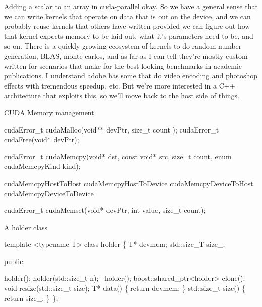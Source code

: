 \begin{frame}[fragile]{Adding a scalar to an array in cuda-parallel}
{  okay.  So we have a general sense that we can write kernels that
  operate on data that is out on the device, and we can probably reuse
  kernels that others have written provided we can figure out how that
  kernel expects memory to be laid out, what it's parameters need to
  be, and so on.  There is a quickly growing ecosystem of kernels to
  do random number generation, BLAS, monte carlos, and as far as I can
  tell they're mostly custom-written for scenarios that make for the
  best looking benchmarks in academic publications.  I understand
  adobe has some that do video encoding and photoshop effects with
  tremendous speedup, etc.  But we're more interested in a C++
  architecture that exploits this, so we'll move back to the host side
  of things.
}
\end{frame}


\begin{frame}[fragile]{CUDA Memory management}
  \begin{semiverbatim}
cudaError_t cudaMalloc(void** devPtr, size_t count );
cudaError_t cudaFree(void* devPtr);

cudaError_t cudaMemcpy(void* dst, const void* src, 
                       size_t count, 
                       enum cudaMemcpyKind kind);

cudaMemcpyHostToHost
cudaMemcpyHostToDevice
cudaMemcpyDeviceToHost
cudaMemcpyDeviceToDevice

cudaError_t cudaMemset(void* devPtr, int value, 
                       size_t count);
  \end{semiverbatim}



\end{frame}


\begin{frame}[fragile]{A holder class}
  \begin{semiverbatim}template <typename T>
class holder
\{
    T* devmem;
    std::size_T size_;

  public:

    holder();
    holder(std::size_t n);
    ~holder();
    boost::shared_ptr<holder> clone();
    void resize(std::size_t size);
    T* data() \{ return devmem; \}
    std::size_t size() \{ return size_; \}
\};
\end{semiverbatim}
\end{frame}

